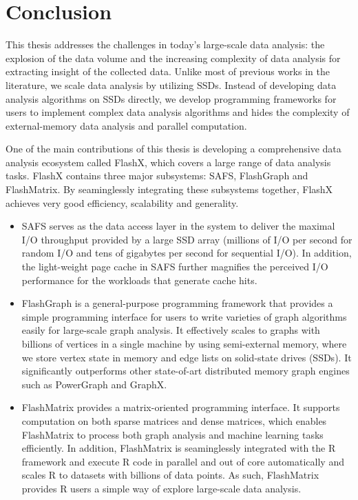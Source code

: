 \chapter{Conclusion}
\label{sec:conclu}
\chaptermark{}

This thesis addresses the challenges in today's large-scale data analysis:
the explosion of the data volume and the increasing complexity of data analysis
for extracting insight of the collected data. Unlike most of previous works
in the literature, we scale data analysis by utilizing SSDs. Instead of developing
data analysis algorithms on SSDs directly, we develop programming frameworks
for users to implement complex data analysis algorithms and hides the complexity
of external-memory data analysis and parallel computation.

One of the main contributions of this thesis is
developing a comprehensive data analysis ecosystem called FlashX, which covers
a large range of data analysis tasks. FlashX contains three major subsystems:
SAFS, FlashGraph and FlashMatrix. By seaminglessly integrating these subsystems
together, FlashX achieves very good efficiency, scalability and generality.
\begin{itemize}
\item SAFS serves as the data access layer in the system to deliver the maximal
	I/O throughput provided by a large SSD array (millions of I/O per second
	for random I/O and tens of gigabytes per second for sequential I/O). In
	addition, the light-weight page cache in SAFS further magnifies the perceived
	I/O performance for the workloads that generate cache hits.
\item FlashGraph is a general-purpose programming framework that provides a simple
	programming interface for users to write varieties of graph algorithms easily
	for large-scale graph analysis. It effectively scales to graphs with billions
	of vertices in a single machine by using semi-external memory, where we store
	vertex state in memory and edge lists on solid-state drives (SSDs). It
	significantly outperforms other state-of-art distributed memory graph engines
	such as PowerGraph and GraphX.
\item FlashMatrix provides a matrix-oriented programming interface. It supports
	computation on both sparse matrices and dense matrices, which enables FlashMatrix
	to process both graph analysis and machine learning tasks efficiently. In addition,
	FlashMatrix is seaminglessly integrated with the R framework and execute
	R code in parallel and out of core automatically and scales R to datasets with
	billions of data points. As such, FlashMatrix provides R users a simple way of
	explore large-scale data analysis.
\end{itemize}

